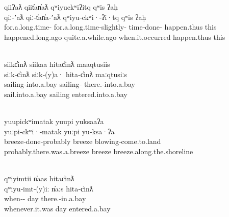 \singlespacing
\renewcommand{\eachwordfive}{\rule[-10pt]{0pt}{0pt}\rmfamily}

\glllll qiiʔaƛ                   qiit̓an̓aƛ                          qʷiyuckʷiʔitq        qʷis        ʔaḥ\\
        qiː‑ʼaƛ                  qiː‑t̓an̓a‑ʼaƛ                      qʷiyu‑ckʷi·‑ʔi·tq    qʷis        ʔaḥ\\
        for.a.long.time‑ for.a.long.time‑slightly‑ time‑done‑ happen.thus this\\
        happened.long.ago        quite.a.while.ago                 when.it.occurred     happen.thus this\\
                                                                 \\
        \vfix

\glllll siikc̓inƛ           siikaa            hitac̓inƛ                  maaqtusiis\\
        siːk‑c̓inƛ          siːk‑(y)a·        hita‑c̓inƛ                 maːqtusiːs\\
        sailing‑into.a.bay sailing‑ there.‑into.a.bay \\
        sail.into.a.bay    sailing           entered.into.a.bay        \\
                                            \\
        \vfix

\glllll yuupickʷimatak              yuupi    yuksaaʔa\\
        yuːpi‑ckʷi·‑matak           yuːpi    yu‑ksa·ʔa\\
        breeze‑done‑probably        breeze   blowing‑come.to.land\\
        probably.there.was.a.breeze breeze   breeze.along.the.shoreline\\
                            \\
        \vfix

\glllll qʷiyimtii                   n̓aas     hitac̓inƛ\\
        qʷiyu‑imt‑(y)iː             n̓aːs     hita‑c̓inƛ\\
        when‑‑ day      there.‑in.a.bay\\
        whenever.it.was             day      entered.a.bay\\
                            \\
        \vfix

